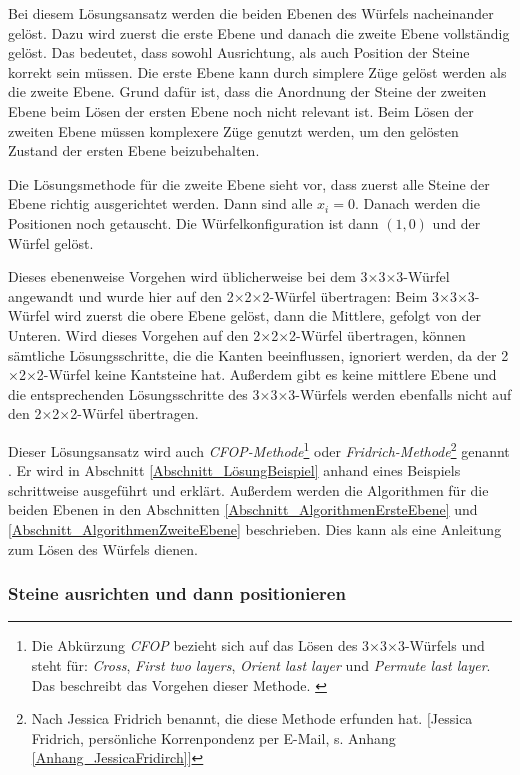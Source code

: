 \documentclass[12pt,a4paper, usenames, dvipsnames]{article}
\theoremstyle{mystyle}
\theoremstyle{definition}
\newcommand{\Ttwo}{2$\times$2$\times$2-}
\newcommand{\Tthree}{3$\times$3$\times$3-}
\begin{document}
Bei diesem Lösungsansatz werden die beiden Ebenen des Würfels nacheinander gelöst. Dazu wird zuerst die erste Ebene und danach die zweite Ebene vollständig gelöst. Das bedeutet, dass sowohl Ausrichtung, als auch Position der Steine korrekt sein müssen. Die erste Ebene kann durch simplere Züge gelöst werden als die zweite Ebene. Grund dafür ist, dass die Anordnung der Steine der zweiten Ebene beim Lösen der ersten Ebene noch nicht relevant ist. Beim Lösen der zweiten Ebene müssen komplexere Züge genutzt werden, um den gelösten Zustand der ersten Ebene beizubehalten. 

Die Lösungsmethode für die zweite Ebene sieht vor, dass zuerst alle Steine der Ebene richtig ausgerichtet werden. Dann sind alle $x_i=0$. Danach werden die Positionen noch getauscht. Die Würfelkonfiguration ist dann $(1,0)$ und der Würfel gelöst.

Dieses ebenenweise Vorgehen wird üblicherweise bei dem \Tthree Würfel angewandt und wurde hier auf den \Ttwo Würfel übertragen: Beim \Tthree Würfel wird zuerst die obere Ebene gelöst, dann die Mittlere, gefolgt von der Unteren. Wird dieses Vorgehen auf den \Ttwo Würfel übertragen, können sämtliche Lösungsschritte, die die Kanten beeinflussen, ignoriert werden, da der \Ttwo Würfel keine Kantsteine hat. Außerdem gibt es keine mittlere Ebene und die entsprechenden Lösungsschritte des \Tthree Würfels werden ebenfalls nicht auf den \Ttwo Würfel übertragen.

Dieser Lösungsansatz wird auch \textit{CFOP-Methode}\footnote{Die Abkürzung \textit{CFOP} bezieht sich auf das Lösen des \Tthree Würfels und steht für: \textit{Cross}, \textit{First two layers}, \textit{Orient last layer} und \textit{Permute last layer}. Das beschreibt das Vorgehen dieser Methode. \cite{DDJT}} oder \textit{Fridrich-Methode}\footnote{Nach Jessica Fridrich benannt, die diese Methode erfunden hat. $[$Jessica Fridrich, persönliche Korrenpondenz per E-Mail, s. Anhang \ref{Anhang_JessicaFridirch}$]$} genannt \cite{DDJT}.
Er wird in Abschnitt \ref{Abschnitt_LösungBeispiel} anhand eines Beispiels schrittweise ausgeführt und erklärt. Außerdem werden die Algorithmen für die beiden Ebenen in den Abschnitten \ref{Abschnitt_AlgorithmenErsteEbene} und \ref{Abschnitt_AlgorithmenZweiteEbene} beschrieben. Dies kann als eine Anleitung zum Lösen des Würfels dienen.

\subsubsection*{Steine ausrichten und dann positionieren}
\end{document}
